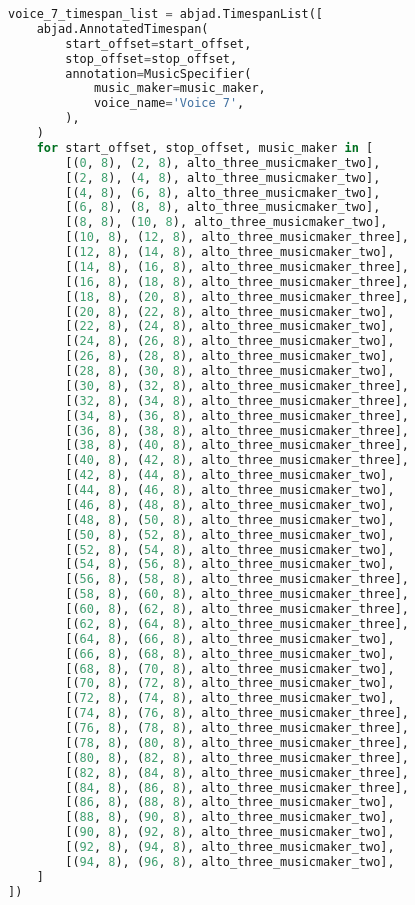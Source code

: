 \begin{lstlisting}[language=Python, caption=Invocation Source Code]
voice_7_timespan_list = abjad.TimespanList([
    abjad.AnnotatedTimespan(
        start_offset=start_offset,
        stop_offset=stop_offset,
        annotation=MusicSpecifier(
            music_maker=music_maker,
            voice_name='Voice 7',
        ),
    )
    for start_offset, stop_offset, music_maker in [
        [(0, 8), (2, 8), alto_three_musicmaker_two],
        [(2, 8), (4, 8), alto_three_musicmaker_two],
        [(4, 8), (6, 8), alto_three_musicmaker_two],
        [(6, 8), (8, 8), alto_three_musicmaker_two],
        [(8, 8), (10, 8), alto_three_musicmaker_two],
        [(10, 8), (12, 8), alto_three_musicmaker_three],
        [(12, 8), (14, 8), alto_three_musicmaker_two],
        [(14, 8), (16, 8), alto_three_musicmaker_three],
        [(16, 8), (18, 8), alto_three_musicmaker_three],
        [(18, 8), (20, 8), alto_three_musicmaker_three],
        [(20, 8), (22, 8), alto_three_musicmaker_two],
        [(22, 8), (24, 8), alto_three_musicmaker_two],
        [(24, 8), (26, 8), alto_three_musicmaker_two],
        [(26, 8), (28, 8), alto_three_musicmaker_two],
        [(28, 8), (30, 8), alto_three_musicmaker_two],
        [(30, 8), (32, 8), alto_three_musicmaker_three],
        [(32, 8), (34, 8), alto_three_musicmaker_three],
        [(34, 8), (36, 8), alto_three_musicmaker_three],
        [(36, 8), (38, 8), alto_three_musicmaker_three],
        [(38, 8), (40, 8), alto_three_musicmaker_three],
        [(40, 8), (42, 8), alto_three_musicmaker_three],
        [(42, 8), (44, 8), alto_three_musicmaker_two],
        [(44, 8), (46, 8), alto_three_musicmaker_two],
        [(46, 8), (48, 8), alto_three_musicmaker_two],
        [(48, 8), (50, 8), alto_three_musicmaker_two],
        [(50, 8), (52, 8), alto_three_musicmaker_two],
        [(52, 8), (54, 8), alto_three_musicmaker_two],
        [(54, 8), (56, 8), alto_three_musicmaker_two],
        [(56, 8), (58, 8), alto_three_musicmaker_three],
        [(58, 8), (60, 8), alto_three_musicmaker_three],
        [(60, 8), (62, 8), alto_three_musicmaker_three],
        [(62, 8), (64, 8), alto_three_musicmaker_three],
        [(64, 8), (66, 8), alto_three_musicmaker_two],
        [(66, 8), (68, 8), alto_three_musicmaker_two],
        [(68, 8), (70, 8), alto_three_musicmaker_two],
        [(70, 8), (72, 8), alto_three_musicmaker_two],
        [(72, 8), (74, 8), alto_three_musicmaker_two],
        [(74, 8), (76, 8), alto_three_musicmaker_three],
        [(76, 8), (78, 8), alto_three_musicmaker_three],
        [(78, 8), (80, 8), alto_three_musicmaker_three],
        [(80, 8), (82, 8), alto_three_musicmaker_three],
        [(82, 8), (84, 8), alto_three_musicmaker_three],
        [(84, 8), (86, 8), alto_three_musicmaker_three],
        [(86, 8), (88, 8), alto_three_musicmaker_two],
        [(88, 8), (90, 8), alto_three_musicmaker_two],
        [(90, 8), (92, 8), alto_three_musicmaker_two],
        [(92, 8), (94, 8), alto_three_musicmaker_two],
        [(94, 8), (96, 8), alto_three_musicmaker_two],
    ]
])


\end{lstlisting}
